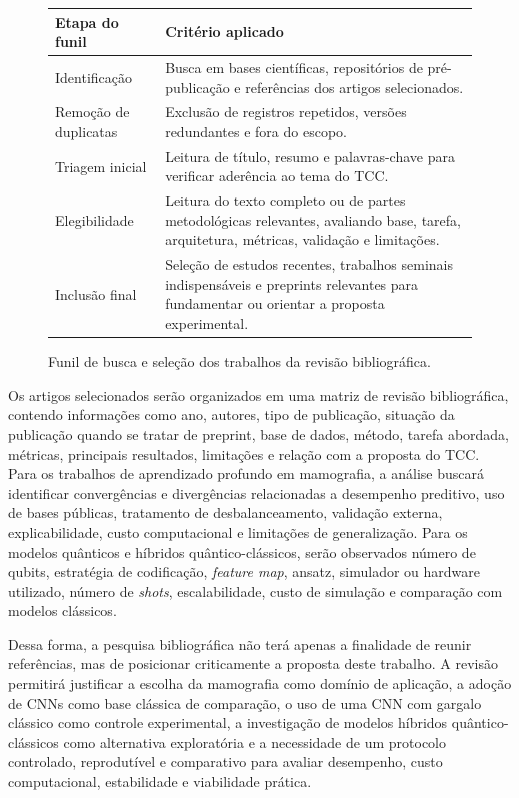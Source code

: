 \documentclass[
    12pt,
    openright,
    oneside,
    a4paper,
    english,
    brazil
]{abntex2}
\begin{document}
\begin{figure}[H]
    \centering
    \begin{tabular}{p{}p{}}
        \toprule
        \textbf{Etapa do funil} & \textbf{Critério aplicado} \\
        \midrule
        Identificação & Busca em bases científicas, repositórios de pré-publicação e referências dos artigos selecionados. \\
        Remoção de duplicatas & Exclusão de registros repetidos, versões redundantes e fora do escopo. \\
        Triagem inicial & Leitura de título, resumo e palavras-chave para verificar aderência ao tema do TCC. \\
        Elegibilidade & Leitura do texto completo ou de partes metodológicas relevantes, avaliando base, tarefa, arquitetura, métricas, validação e limitações. \\
        Inclusão final & Seleção de estudos recentes, trabalhos seminais indispensáveis e preprints relevantes para fundamentar ou orientar a proposta experimental. \\
        \bottomrule
    \end{tabular}
    \caption{Funil de busca e seleção dos trabalhos da revisão bibliográfica.}
    \label{fig:funil_busca_bibliografica}
\end{figure}

Os artigos selecionados serão organizados em uma matriz de revisão bibliográfica, contendo informações como ano, autores, tipo de publicação, situação da publicação quando se tratar de preprint, base de dados, método, tarefa abordada, métricas, principais resultados, limitações e relação com a proposta do TCC. Para os trabalhos de aprendizado profundo em mamografia, a análise buscará identificar convergências e divergências relacionadas a desempenho preditivo, uso de bases públicas, tratamento de desbalanceamento, validação externa, explicabilidade, custo computacional e limitações de generalização. Para os modelos quânticos e híbridos quântico-clássicos, serão observados número de qubits, estratégia de codificação, \textit{feature map}, ansatz, simulador ou hardware utilizado, número de \textit{shots}, escalabilidade, custo de simulação e comparação com modelos clássicos.

Dessa forma, a pesquisa bibliográfica não terá apenas a finalidade de reunir referências, mas de posicionar criticamente a proposta deste trabalho. A revisão permitirá justificar a escolha da mamografia como domínio de aplicação, a adoção de CNNs como base clássica de comparação, o uso de uma CNN com gargalo clássico como controle experimental, a investigação de modelos híbridos quântico-clássicos como alternativa exploratória e a necessidade de um protocolo controlado, reprodutível e comparativo para avaliar desempenho, custo computacional, estabilidade e viabilidade prática.
\end{document}
